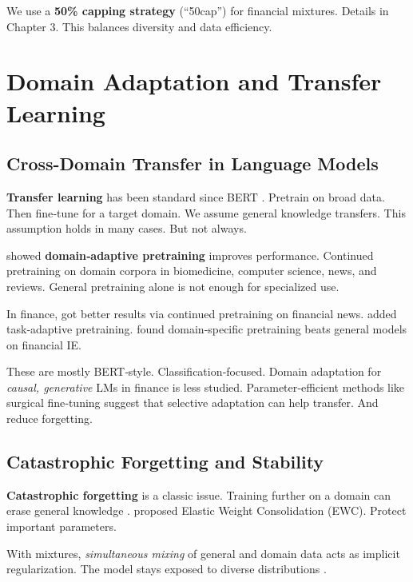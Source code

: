 We use a \textbf{50\% capping strategy} (``50cap'') for financial mixtures. Details in Chapter 3. This balances diversity and data efficiency.

\section{Domain Adaptation and Transfer Learning}

\subsection{Cross-Domain Transfer in Language Models}

\textbf{Transfer learning} has been standard since BERT \parencite{devlin2019bert,pan2010transfer,zhuang2020comprehensive}. Pretrain on broad data. Then fine‑tune for a target domain. We assume general knowledge transfers. This assumption holds in many cases. But not always.

\textcite{gururangan2020don} showed \textbf{domain‑adaptive pretraining} improves performance. Continued pretraining on domain corpora in biomedicine, computer science, news, and reviews. General pretraining alone is not enough for specialized use.

In finance, \textcite{araci2019finbert} got better results via continued pretraining on financial news. \textcite{yang2020finbert} added task‑adaptive pretraining. \textcite{huang2023finbert} found domain‑specific pretraining beats general models on financial IE.

These are mostly BERT‑style. Classification‑focused. Domain adaptation for \textit{causal, generative} LMs in finance is less studied. Parameter‑efficient methods like surgical fine‑tuning \parencite{lee2022surgical} suggest that selective adaptation can help transfer. And reduce forgetting.

\subsection{Catastrophic Forgetting and Stability}

\textbf{Catastrophic forgetting} is a classic issue. Training further on a domain can erase general knowledge \parencite{mccloskey1989catastrophic, french1999catastrophic}. \textcite{kirkpatrick2017overcoming} proposed Elastic Weight Consolidation (EWC). Protect important parameters.

With mixtures, \textit{simultaneous mixing} of general and domain data acts as implicit regularization. The model stays exposed to diverse distributions \parencite{arivazhagan2019massively,raffel2020exploring}.

